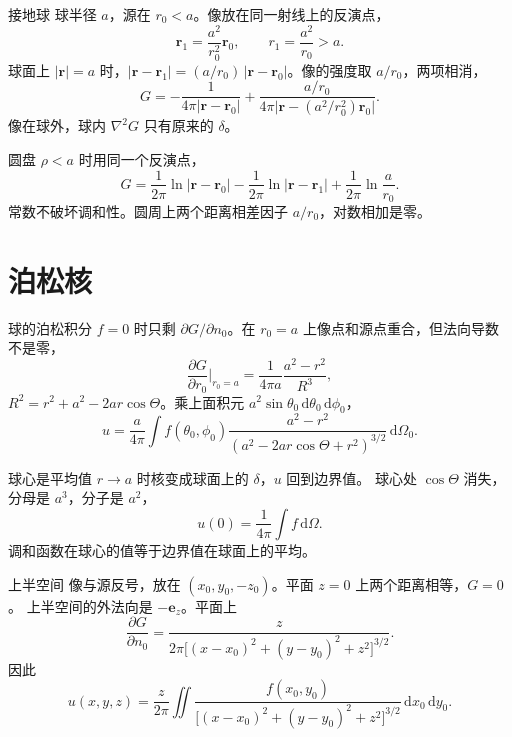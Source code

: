 \documentclass[fontset=windows, chinese, 10pt, xcolor=dvipsnames]{beamer}
\begin{document}
\begin{frame}{接地球}
  球半径 $a$，源在 $r_0<a$。像放在同一射线上的反演点，
  \[
    \mathbf{r}_1=\frac{a^2}{r_0^2}\mathbf{r}_0,
    \qquad r_1=\frac{a^2}{r_0}>a.
  \]
  球面上 $|\mathbf{r}|=a$ 时，$|\mathbf{r}-\mathbf{r}_1|=(a/r_0)\,|\mathbf{r}-\mathbf{r}_0|$。像的强度取 $a/r_0$，两项相消，
  \begin{equation*}
    G
    =-\frac{1}{4\pi|\mathbf{r}-\mathbf{r}_0|}
     +\frac{a/r_0}{4\pi\bigl|\mathbf{r}-(a^2/r_0^2)\mathbf{r}_0\bigr|}.
  \end{equation*}
  像在球外，球内 $\nabla^2 G$ 只有原来的 $\delta$。
\end{frame}

\begin{frame}{圆盘}
  $\rho<a$ 时用同一个反演点，
  \[
    G
    =\frac{1}{2\pi}\ln|\mathbf{r}-\mathbf{r}_0|
     -\frac{1}{2\pi}\ln|\mathbf{r}-\mathbf{r}_1|
     +\frac{1}{2\pi}\ln\frac{a}{r_0}.
  \]
  常数不破坏调和性。圆周上两个距离相差因子 $a/r_0$，对数相加是零。
\end{frame}

\section{泊松核}

\begin{frame}{球的泊松积分}
  $f=0$ 时只剩 $\partial G/\partial n_0$。在 $r_0=a$ 上像点和源点重合，但法向导数不是零，
  \[
    \frac{\partial G}{\partial r_0}\Big|_{r_0=a}
    =\frac{1}{4\pi a}\frac{a^2-r^2}{R^3},
  \]
  $R^2=r^2+a^2-2ar\cos\Theta$。乘上面积元 $a^2\sin\theta_0\,\mathrm{d}\theta_0\,\mathrm{d}\phi_0$，
  \begin{equation*}
    u
    =\frac{a}{4\pi}\int
      f(\theta_0,\phi_0)
      \frac{a^2-r^2}{(a^2-2ar\cos\Theta+r^2)^{3/2}}
      \,\mathrm{d}\Omega_0.
  \end{equation*}
\end{frame}

\begin{frame}{球心是平均值}
  $r\to a$ 时核变成球面上的 $\delta$，$u$ 回到边界值。
  \vspace{0.4em}
  球心处 $\cos\Theta$ 消失，分母是 $a^3$，分子是 $a^2$，
  \[
    u(0)=\frac{1}{4\pi}\int f\,\mathrm{d}\Omega.
  \]
  调和函数在球心的值等于边界值在球面上的平均。
\end{frame}

\begin{frame}{上半空间}
  像与源反号，放在 $(x_0,y_0,-z_0)$。平面 $z=0$ 上两个距离相等，$G=0$。
  \vspace{0.3em}
  上半空间的外法向是 $-\mathbf{e}_z$。平面上
  \[
    \frac{\partial G}{\partial n_0}
    =\frac{z}{2\pi\bigl[(x-x_0)^2+(y-y_0)^2+z^2\bigr]^{3/2}}.
  \]
  因此
  \[
    u(x,y,z)
    =\frac{z}{2\pi}\iint
      \frac{f(x_0,y_0)}
           {\bigl[(x-x_0)^2+(y-y_0)^2+z^2\bigr]^{3/2}}
      \,\mathrm{d}x_0\,\mathrm{d}y_0.
  \]
\end{frame}
\end{document}
